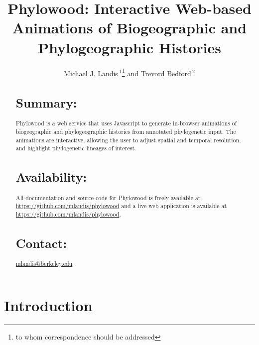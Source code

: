 \documentclass{bioinfo}
\begin{document}



\title[Phylowood: biogeographic animations]{Phylowood: Interactive Web-based Animations of Biogeographic and Phylogeographic Histories}
\author[Sample \textit{et~al}]{Michael J. Landis\,$^{1}$\footnote{to whom correspondence should be addressed} and Trevord Bedford\,$^2$}
\address{$^{1}$Department of Integrative Biology, UC Berkeley, Berkeley, California, USA\\
$^{2}$Institute of Evolution, University of Edinburgh, Edinburgh, UK}



\maketitle

\begin{abstract}

\section{Summary:} Phylowood is a web service that uses Javascript to generate in-browser animations of biogeographic and phylogeographic histories from annotated phylogenetic input. The animations are interactive, allowing the user to adjust spatial and temporal resolution, and highlight phylogenetic lineages of interest.

\section{Availability:} All documentation and source code for Phylowood is freely available at \href{https://github.com/mlandis/phylowood}{https://github.com/mlandis/phylowood} and a live web application is available at \href{https://mlandis.github.io/phylowood}{https://github.com/mlandis/phylowood}.

\section{Contact:} \href{mlandis@berkeley.edu}{mlandis@berkeley.edu}
\end{abstract}

\section{Introduction}
\end{document}

